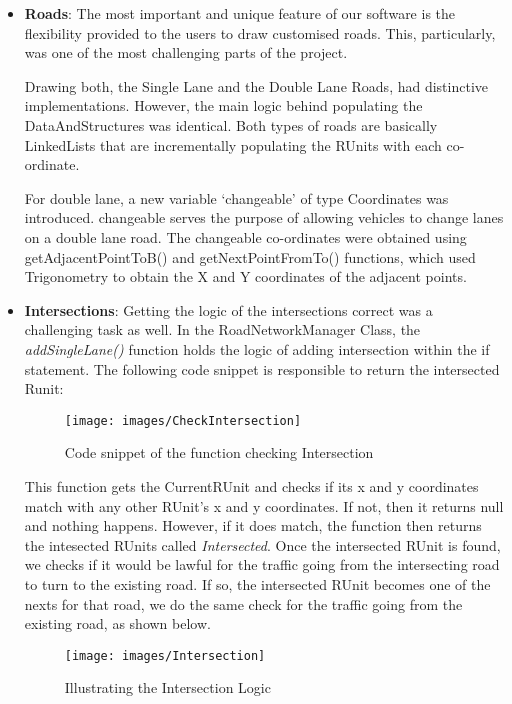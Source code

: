 \documentclass[11pt,a4paper]{article}
\begin{document}
  \begin{itemize}
  	\item \textbf{Roads}: The most important and unique feature of our
  	software is the flexibility provided to the users to draw
  	customised roads. This, particularly, was one of the most
  	challenging parts of the project. 
	
  	Drawing both, the Single Lane and the Double Lane Roads, had
  	distinctive implementations. However, the main logic behind
  	populating the DataAndStructures was identical. Both types of roads
  	are basically LinkedLists that are incrementally populating the
  	RUnits with each co-ordinate. 
  	
  	For double lane, a new variable ‘changeable’ of type Coordinates
  	was introduced. changeable serves the purpose of allowing vehicles
  	to change lanes on a double lane road. The changeable co-ordinates
  	were obtained using
  	getAdjacentPointToB() and getNextPointFromTo() functions, which
  	used Trigonometry to obtain the X and Y coordinates of the adjacent
  	points.

  	\item \textbf{Intersections}: Getting the logic of the intersections correct was a challenging task as well. In the RoadNetworkManager Class, the \textit{addSingleLane()} function holds the logic of adding intersection within the if statement. The following code snippet is responsible to return the intersected Runit:  	
  		
  		\begin{figure}[h!]
			\texttt{[image: images/CheckIntersection]}
			\caption{Code snippet of the function checking Intersection}
			\centering
		\end{figure}
  		This function gets the CurrentRUnit and checks if its x and y coordinates match with any other RUnit’s x and y coordinates. If not, then it returns null and nothing happens. However, if it does match, the function then returns the intesected RUnits called \textit{Intersected}. 
  		Once the intersected RUnit is found, we checks if it would be lawful for the traffic going from the intersecting road to turn to the existing road. If so, the intersected RUnit becomes one of the nexts for that road, we do the same check for the traffic going from the existing road, as shown below.  
  		
  		\begin{figure}[h!]
			\texttt{[image: images/Intersection]}
			\caption{Illustrating the Intersection Logic}
			\centering
		\end{figure} 		
  		

\end{itemize}
\end{document}
